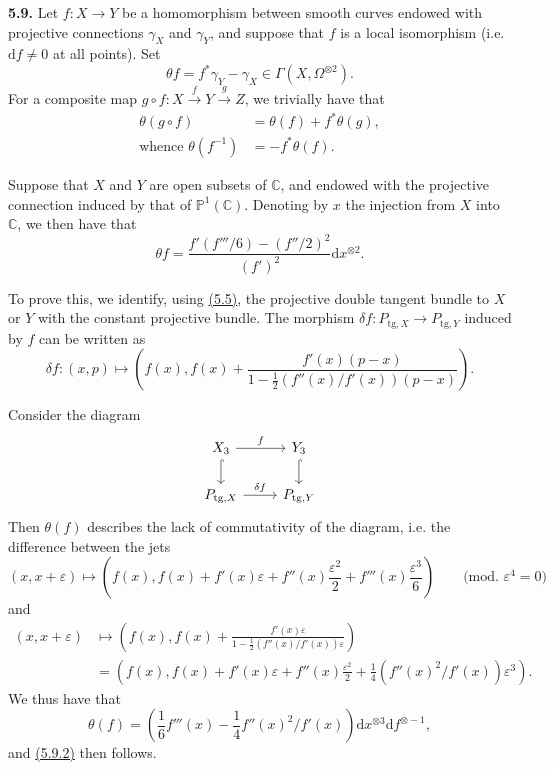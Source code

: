 \documentclass{report}
\newenvironment{rmenv}[1]
  {\phantomsection\par\medskip\noindent\textbf{#1.}\rmfamily}
  {\medskip}
\newcommand{\PP}{\mathbb{P}}
\newcommand{\CC}{\mathbb{C}}
\newcommand{\dd}{\mathrm{d}}
\newcommand{\tg}{\mathrm{tg}}
\newcommand{\oldpage}[1]{\marginpar{\footnotesize$\Big\vert$ \textit{p.~#1}}}
\begin{document}
\begin{rmenv}{5.9}
\label{I.5.9}
  Let $f\colon X\to Y$ be a homomorphism between smooth curves endowed with projective connections $\gamma_X$ and $\gamma_Y$, and suppose that $f$ is a local isomorphism (i.e. $\dd f\neq0$ at all points).
  Set
  \[
    \theta f = f^*\gamma_Y - \gamma_X \in \Gamma(X,\Omega^{\otimes2}).
  \]
  For a composite map $g\circ f\colon X\xrightarrow{f}Y\xrightarrow{g}Z$, we trivially have that
  \[
  \label{I.5.9.1}
    \begin{aligned}
      \theta(g\circ f) &= \theta(f) + f^*\theta(g),
    \\\mbox{whence }\theta(f^{-1}) &= -f^*\theta(f).
    \end{aligned}
  \tag{5.9.1}
  \]

  Suppose that $X$ and $Y$ are open subsets of $\CC$, and endowed with the projective connection induced by that of $\PP^1(\CC)$.
  Denoting by $x$ the injection from $X$ into $\CC$, we then have that
\oldpage{33}
  \[
  \label{I.5.9.2}
    \theta f = \frac{f'(f'''/6) - (f''/2)^2}{(f')^2} \dd x^{\otimes2}.
  \tag{5.9.2}
  \]

  To prove this, we identify, using \hyperref[I.5.5]{(5.5)}, the projective double tangent bundle to $X$ or $Y$ with the constant projective bundle.
  The morphism $\delta f\colon P_{\tg,X}\to P_{\tg,Y}$ induced by $f$ can be written as
  \[
    \delta f\colon (x,p) \mapsto
    \left(
      f(x),
      f(x) + \frac{f'(x)(p-x)}{1-\frac12(f''(x)/f'(x))(p-x)}
    \right).
  \]

  Consider the diagram
  \[
    \begin{tikzcd}
      X_3 \rar["f"] \dar[hook]
      & Y_3 \dar[hook]
    \\P_{\tg,X} \rar["\delta f"]
      & P_{\tg,Y}
    \end{tikzcd}
  \]
  Then $\theta(f)$ describes the lack of commutativity of the diagram, i.e. the difference between the jets
  \[
    (x,x+\varepsilon)
    \mapsto
    \left(
      f(x),
      f(x) + f'(x)\varepsilon + f''(x)\frac{\varepsilon^2}{2} + f'''(x)\frac{\varepsilon^3}{6}
    \right)
    \qquad\mbox{(mod. $\varepsilon^4=0$)}
  \]
  and
  \[
    \begin{aligned}
      (x,x+\varepsilon)
      &\mapsto
      \left(
        f(x),
        f(x) + \frac{f'(x)\varepsilon}{1-\frac12(f''(x)/f'(x))\varepsilon}
      \right)
    \\&= \left(
        f(x),
        f(x) + f'(x)\varepsilon + f''(x)\frac{\varepsilon^2}{2} + \frac14(f''(x)^2/f'(x))\varepsilon^3
      \right).
    \end{aligned}
  \]
  We thus have that
  \[
    \theta(f) =
    \left(
      \frac16f'''(x) - \frac14f''(x)^2/f'(x)
    \right) \dd x^{\otimes3} \dd f^{\otimes-1},
  \]
  and \hyperref[I.5.9.2]{(5.9.2)} then follows.


\end{rmenv}
\end{document}
